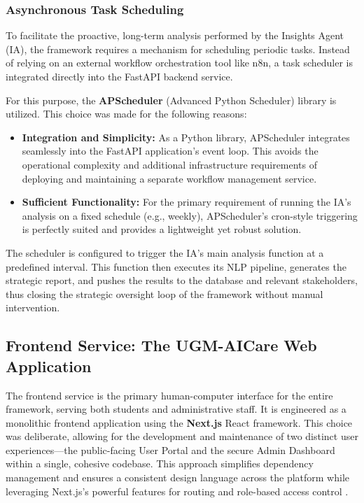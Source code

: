 \subsubsection{Asynchronous Task Scheduling}

To facilitate the proactive, long-term analysis performed by the Insights Agent (IA), the framework requires a mechanism for scheduling periodic tasks. Instead of relying on an external workflow orchestration tool like n8n, a task scheduler is integrated directly into the FastAPI backend service.

For this purpose, the \textbf{APScheduler} (Advanced Python Scheduler) library is utilized. This choice was made for the following reasons:
\begin{itemize}
    \item \textbf{Integration and Simplicity:} As a Python library, APScheduler integrates seamlessly into the FastAPI application's event loop. This avoids the operational complexity and additional infrastructure requirements of deploying and maintaining a separate workflow management service.
    \item \textbf{Sufficient Functionality:} For the primary requirement of running the IA's analysis on a fixed schedule (e.g., weekly), APScheduler's cron-style triggering is perfectly suited and provides a lightweight yet robust solution.
\end{itemize}
The scheduler is configured to trigger the IA's main analysis function at a predefined interval. This function then executes its NLP pipeline, generates the strategic report, and pushes the results to the database and relevant stakeholders, thus closing the strategic oversight loop of the framework without manual intervention.

\subsection{Frontend Service: The UGM-AICare Web Application}

The frontend service is the primary human-computer interface for the entire framework, serving both students and administrative staff. It is engineered as a monolithic frontend application using the \textbf{Next.js} React framework. This choice was deliberate, allowing for the development and maintenance of two distinct user experiences—the public-facing User Portal and the secure Admin Dashboard within a single, cohesive codebase. This approach simplifies dependency management and ensures a consistent design language across the platform while leveraging Next.js's powerful features for routing and role-based access control \cite{FIND_CITATION_HERE}.

